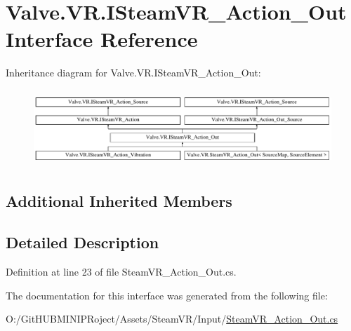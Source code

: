 \hypertarget{interface_valve_1_1_v_r_1_1_i_steam_v_r___action___out}{}\section{Valve.\+V\+R.\+I\+Steam\+V\+R\+\_\+\+Action\+\_\+\+Out Interface Reference}
\label{interface_valve_1_1_v_r_1_1_i_steam_v_r___action___out}
Inheritance diagram for Valve.\+V\+R.\+I\+Steam\+V\+R\+\_\+\+Action\+\_\+\+Out\+:\begin{figure}[H]
\begin{center}
\leavevmode
\includegraphics[height=2.924282cm]{interface_valve_1_1_v_r_1_1_i_steam_v_r___action___out}
\end{center}
\end{figure}
\subsection*{Additional Inherited Members}


\subsection{Detailed Description}


Definition at line 23 of file Steam\+V\+R\+\_\+\+Action\+\_\+\+Out.\+cs.



The documentation for this interface was generated from the following file\+:\begin{DoxyCompactItemize}
\item 
O\+:/\+Git\+H\+U\+B\+M\+I\+N\+I\+P\+Roject/\+Assets/\+Steam\+V\+R/\+Input/\mbox{\hyperlink{_steam_v_r___action___out_8cs}{Steam\+V\+R\+\_\+\+Action\+\_\+\+Out.\+cs}}\end{DoxyCompactItemize}
